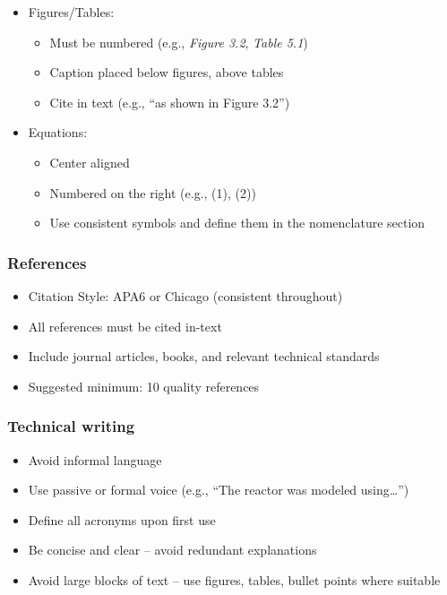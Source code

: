 \documentclass[
  12pt,
  a4paperpaper,
  DIV=11,
  numbers=noendperiod]{scrartcl}
\providecommand{\tightlist}{%
  \setlength{\itemsep}{0pt}\setlength{\parskip}{0pt}}\usepackage{longtable,booktabs,array}
\begin{document}
\begin{itemize}
\tightlist
\item
  Figures/Tables:

  \begin{itemize}
  \tightlist
  \item
    Must be numbered (e.g., \emph{Figure 3.2}, \emph{Table 5.1})
  \item
    Caption placed below figures, above tables
  \item
    Cite in text (e.g., ``as shown in Figure 3.2'')
  \end{itemize}
\item
  Equations:

  \begin{itemize}
  \tightlist
  \item
    Center aligned
  \item
    Numbered on the right (e.g., (1), (2))
  \item
    Use consistent symbols and define them in the nomenclature section
  \end{itemize}
\end{itemize}

\subsubsection{References}\label{references}

\begin{itemize}
\tightlist
\item
  Citation Style: APA6 or Chicago (consistent throughout)
\item
  All references must be cited in-text
\item
  Include journal articles, books, and relevant technical standards
\item
  Suggested minimum: 10 quality references
\end{itemize}

\subsubsection{Technical writing}\label{technical-writing}

\begin{itemize}
\tightlist
\item
  Avoid informal language
\item
  Use passive or formal voice (e.g., ``The reactor was modeled
  using\ldots{}'')
\item
  Define all acronyms upon first use
\item
  Be concise and clear -- avoid redundant explanations
\item
  Avoid large blocks of text -- use figures, tables, bullet points where
  suitable
\end{itemize}
\end{document}
